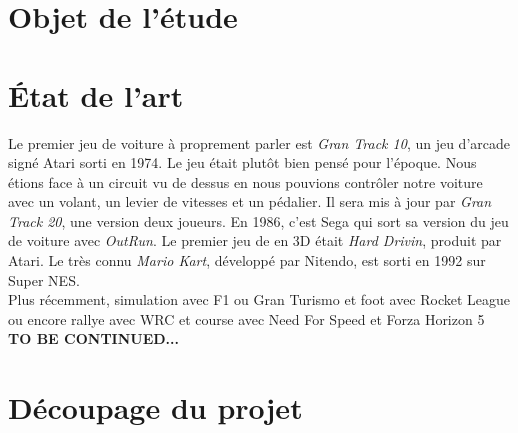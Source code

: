 \documentclass[11pt,a4paper]{article}
\begin{document}
\section{Objet de l'étude}

\clearpage

\section{État de l'art}
Le premier jeu de voiture à proprement parler est \textit{Gran Track 10}, un jeu d'arcade signé Atari 
sorti en 1974. Le jeu était plutôt bien pensé pour l'époque. Nous étions face à un 
circuit vu de dessus en nous pouvions contrôler notre voiture avec un volant, un levier de vitesses
et un pédalier. Il sera mis à jour par \textit{Gran Track 20}, une version deux joueurs.
En 1986, c'est Sega qui sort sa version du jeu de voiture avec \textit{OutRun}. Le premier 
jeu de en 3D était \textit{Hard Drivin}, produit par Atari. Le très connu \textit{Mario Kart},
développé par Nitendo, est sorti en 1992 sur Super NES.\\
\indent Plus récemment, simulation avec F1 ou Gran Turismo et foot avec Rocket League ou encore 
rallye avec WRC et course avec Need For Speed et Forza Horizon 5\\
\textbf{TO BE CONTINUED...}
\clearpage

\section{Découpage du projet}
\end{document}

